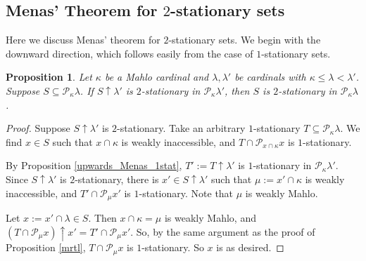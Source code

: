 \documentclass[a4paper,12pt,reqno,oneside]{amsart}
\theoremstyle{plain}
\newtheorem{prop}[theorem]{Proposition}
\newcommand{\mcal}{\mathcal}
\begin{document}
\subsection{Menas' Theorem for $2$-stationary sets} \label{sec:Means_2stat}


Here we discuss Menas' theorem for $2$-stationary sets. We begin with the downward direction, which follows easily from the case of $1$-stationary sets.


\begin{prop} \label{prop:downward_Menas_2stat}
Let $\kappa$ be a Mahlo cardinal and $\lambda , \lambda '$ be cardinals with $\kappa \leq \lambda < \lambda'$. Suppose $S \subseteq \mcal{P}_\kappa \lambda$. If $S \uparrow \lambda '$ is $2$-stationary in $\mcal{P}_{\kappa}\lambda'$, then $S$ is $2$-stationary in $\mcal{P}_{\kappa}{\lambda}$.
\end{prop}

\begin{proof}  %
Suppose $S \uparrow \lambda '$ is $2$-stationary. Take an arbitrary $1$-stationary $T \subseteq \mcal{P}_{\kappa}{\lambda}$. We find $x \in S$ such that $x \cap \kappa$ is weakly inaccessible, and $T \cap \mcal{P}_{x \cap \kappa} x$ is $1$-stationary.

By Proposition \ref{upwards_Menas_1stat}, $T' := T \uparrow \lambda '$ is $1$-stationary in $\mcal{P}_{\kappa}{\lambda'}$. Since $S \uparrow \lambda '$ is $2$-stationary, there is $x' \in S \uparrow \lambda'$ such that $\mu := x' \cap \kappa$ is weakly inaccessible, and $T' \cap \mcal{P}_\mu x'$ is $1$-stationary. Note that $\mu$ is weakly Mahlo.

Let $x := x' \cap \lambda \in S$. Then $x \cap \kappa = \mu$ is weakly Mahlo, and $( T \cap \mcal{P}_\mu x ) \uparrow x' = T' \cap \mcal{P}_\mu x'$. So, by the same argument as the proof of Proposition \ref{mrtl}, $T \cap \mcal{P}_\mu x$ is $1$-stationary. So $x$ is as desired.
\end{proof}  %
\end{document}
